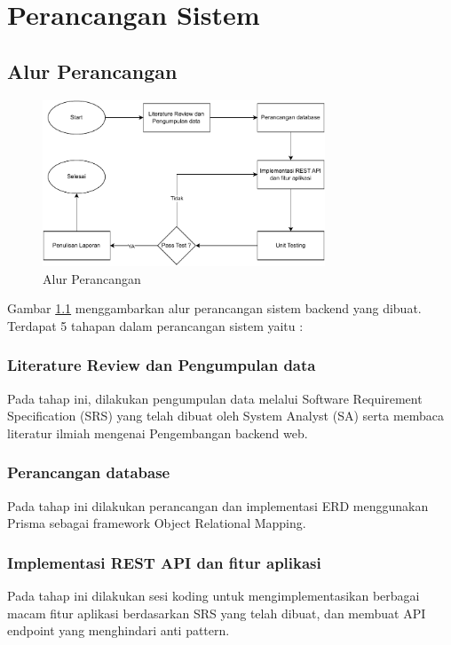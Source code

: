 \chapter{Perancangan Sistem}

\section{Alur Perancangan}
\begin{figure}[h]
	\centering
	\includegraphics[width=0.75\textwidth]{drawio/alur-perancangan.drawio.pdf}
	\caption{Alur Perancangan}
	\label{alur-perancangan}
\end{figure}
Gambar \ref{alur-perancangan} menggambarkan alur perancangan sistem backend yang dibuat. Terdapat 5 tahapan dalam perancangan sistem yaitu :
\subsection{Literature Review dan Pengumpulan data}
Pada tahap ini, dilakukan pengumpulan data melalui Software Requirement Specification (SRS) yang telah dibuat oleh System Analyst (SA) serta membaca literatur ilmiah mengenai Pengembangan backend web.

\subsection{Perancangan database}
Pada tahap ini dilakukan perancangan dan implementasi ERD menggunakan Prisma sebagai framework Object Relational Mapping.

\subsection{Implementasi REST API dan fitur aplikasi}
Pada tahap ini dilakukan sesi koding untuk mengimplementasikan berbagai macam fitur aplikasi berdasarkan SRS yang telah dibuat, dan membuat API endpoint yang menghindari anti pattern.

